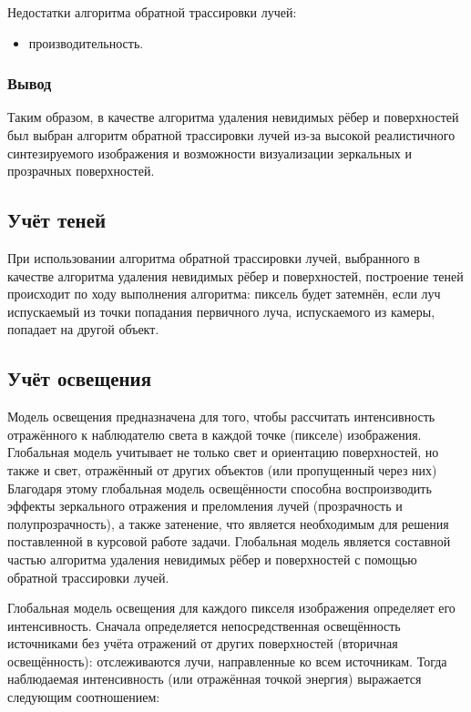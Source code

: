 Недостатки алгоритма обратной трассировки лучей:
\begin{itemize}
	\item производительность.
\end{itemize}

\subsubsection{Вывод}

Таким образом, в качестве алгоритма удаления невидимых рёбер и поверхностей был выбран алгоритм обратной трассировки лучей из-за высокой реалистичного синтезируемого изображения и возможности визуализации зеркальных и прозрачных поверхностей.

\subsection{Учёт теней}

При использовании алгоритма обратной трассировки лучей, выбранного в качестве алгоритма удаления невидимых рёбер и поверхностей, построение теней происходит по ходу выполнения алгоритма: пиксель будет затемнён, если луч испускаемый из точки попадания первичного луча, испускаемого из камеры, попадает на другой объект.

\subsection{Учёт освещения}

Модель освещения предназначена для того, чтобы рассчитать интенсивность отражённого к наблюдателю света в каждой точке (пикселе) изображения. Глобальная модель учитывает не только свет и ориентацию поверхностей, но также и свет, отражённый от других объектов (или пропущенный через них) Благодаря этому глобальная модель освещённости способна воспроизводить эффекты зеркального отражения и преломления лучей (прозрачность и полупрозрачность), а также затенение, что является необходимым для решения поставленной в курсовой работе задачи. Глобальная модель является составной частью алгоритма удаления невидимых рёбер и поверхностей с помощью обратной трассировки лучей.

Глобальная модель освещения для каждого пикселя изображения определяет его интенсивность. Сначала определяется непосредственная освещённость источниками без учёта отражений от других поверхностей (вторичная освещённость): отслеживаются лучи, направленные ко всем источникам. Тогда наблюдаемая интенсивность (или отражённая точкой энергия) выражается следующим соотношением:

